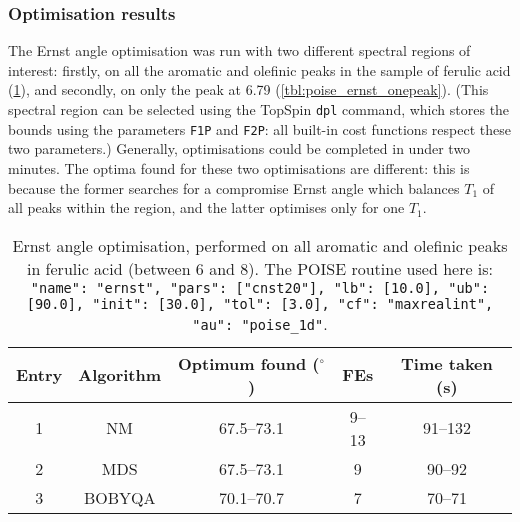 \subsubsection{Optimisation results}

The Ernst angle optimisation was run with two different spectral regions of interest: firstly, on all the aromatic and olefinic peaks in the sample of ferulic acid (\cref{tbl:poise_ernst_fivepeaks}), and secondly, on only the peak at \SI{6.79}{\ppm} (\cref{tbl:poise_ernst_onepeak}).
(This spectral region can be selected using the TopSpin \texttt{dpl} command, which stores the bounds using the parameters \texttt{F1P} and \texttt{F2P}: all built-in cost functions respect these two parameters.)
Generally, optimisations could be completed in under two minutes.
The optima found for these two optimisations are different: this is because the former searches for a compromise Ernst angle which balances $T_1$ of all peaks within the region, and the latter optimises only for one $T_1$.

\begin{table}[htb]
    \centering
    \begin{tabular}{ccccc}
        \toprule
        Entry & Algorithm & Optimum found ($^\circ$) & FEs   & Time taken (\si{\s}) \\
        \midrule
        1     & NM        & 67.5--73.1               & 9--13 & 91--132              \\
        2     & MDS       & 67.5--73.1               & 9     & 90--92               \\
        3     & BOBYQA    & 70.1--70.7               & 7     & 70--71               \\
        \bottomrule
    \end{tabular}
    \caption[Ernst angle optimisations on a range of peaks]{
        Ernst angle optimisation, performed on all aromatic and olefinic peaks in ferulic acid (between 6 and \SI{8}{\ppm}).
        The POISE routine used here is: \texttt{{"name": "ernst", "pars": ["cnst20"], "lb": [10.0], "ub": [90.0], "init": [30.0], "tol": [3.0], "cf": "maxrealint", "au": "poise_1d"}}.
    }
    \label{tbl:poise_ernst_fivepeaks}
\end{table}


